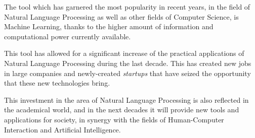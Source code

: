 The tool which has garnered the most popularity in recent years, in the field of Natural Language Processing as well as other fields of Computer Science, is Machine Learning, thanks to the higher amount of information and computational power currently available.

This tool has allowed for a significant increase of the practical applications of Natural Language Processing during the last decade. This has created new jobs in large companies and newly-created \textit{startups} that have seized the opportunity that these new technologies bring.

This investment in the area of Natural Language Processing is also reflected in the academical world, and in the next decades it will provide new tools and applications for society, in synergy with the fields of Human-Computer Interaction and Artificial Intelligence.
